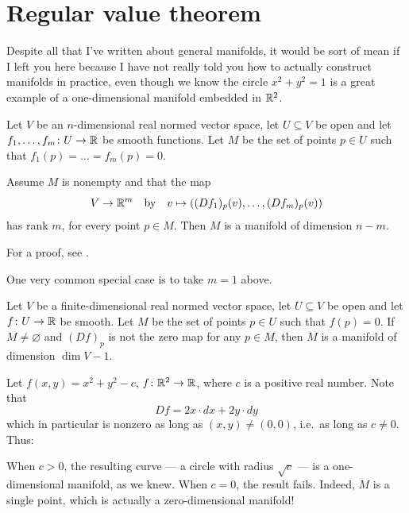 \section{Regular value theorem}
Despite all that I've written about general manifolds,
it would be sort of mean if I left you here
because I have not really told you how to actually construct
manifolds in practice, even though we know the circle
$x^2+y^2=1$ is a great example of a one-dimensional
manifold embedded in $\mathbb R^2$.

\begin{theorem}
	Let $V$ be an $n$-dimensional real normed vector
	space, let $U \subseteq V$ be open
	and let $f_1, \dots, f_m \colon U \to \mathbb R$
	be smooth functions.
	Let $M$ be the set of points $p \in U$
	such that $f_1(p) = \dots = f_m(p) = 0$.

	Assume $M$ is nonempty and that the map
	\[ V \to \mathbb R^m \quad\text{by}\quad
		v \mapsto \left( (Df_1)_p(v), \dots, (Df_m)_p(v) \right) \]
	has rank $m$, for every point $p \in M$.
	Then $M$ is a manifold of dimension $n-m$.
\end{theorem}
For a proof, see \cite[Theorem 6.3]{ref:manifolds}.

One very common special case is to take $m = 1$ above.
\begin{corollary}
	Let $V$ be a finite-dimensional real normed vector
	space, let $U \subseteq V$ be open
	and let $f \colon U \to \mathbb R$ be smooth.
	Let $M$ be the set of points $p \in U$
	such that $f(p) = 0$.
	If $M \neq \varnothing$ and $(Df)_p$ is not the zero map for any $p \in M$,
	then $M$ is a manifold of dimension $\dim V-1$.
\end{corollary}

\begin{example}
	[The circle $x^2+y^2-c=0$]
	Let $f(x,y) = x^2+y^2 - c$, $f \colon \mathbb R^2 \to \mathbb R$,
	where $c$ is a positive real number.
	Note that
	\[ Df = 2x \cdot dx + 2y \cdot dy \]
	which in particular is nonzero
	as long as $(x,y) \neq (0,0)$, i.e.\ as long as $c \neq 0$.
	Thus:
	\begin{itemize}
		\ii When $c > 0$, the resulting curve ---
		a circle with radius $\sqrt c$ ---
		is a one-dimensional manifold, as we knew.
		\ii When $c = 0$, the result fails.
		Indeed, $M$ is a single point,
		which is actually a zero-dimensional manifold!
	\end{itemize}
\end{example}

